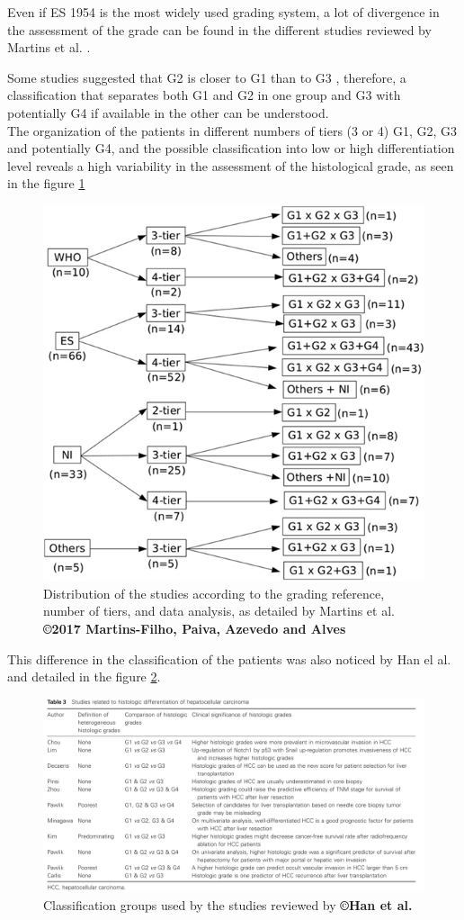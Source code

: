 \documentclass[]{article}
\begin{document}
Even if ES 1954 is the most widely used grading system, a lot of
divergence in the assessment of the grade can be found in the different
studies reviewed by Martins et al. \cite{Martins2017}.

Some studies suggested that G2 is closer to G1 than to G3 \cite{Han2013,Zucman-Rossi2015}, therefore, a classification that separates
both G1 and G2 in one group and G3 with potentially G4 if available in
the other can be understood.\\
The organization of the patients in different numbers of tiers (3 or 4)
G1, G2, G3 and potentially G4, and the possible classification into low
or high differentiation level reveals a high variability in the
assessment of the histological grade, as seen in the figure \ref{fig:martins2017_figure2}


\begin{figure}[th!]
\centering
\includegraphics[width=0.5\linewidth]{images/martins2017_figure2}
\caption{Distribution of the studies according to the grading reference, number of tiers, and data analysis, as detailed by Martins et al. \cite{Martins2017} \textbf{©2017 Martins-Filho, Paiva, Azevedo and Alves}}
\label{fig:martins2017_figure2}
\end{figure}



This difference in the classification of the patients was also noticed
by Han el al. \cite{Han2013} and detailed in the figure \ref{fig:han2013_table3}.

\begin{figure}[th!]
\centering
\includegraphics[width=0.9\linewidth]{images/image9}
\caption{Classification groups used by the studies reviewed by \textbf{©Han et al.} \cite{Han2013}}
\label{fig:han2013_table3}
\end{figure}
\end{document}
